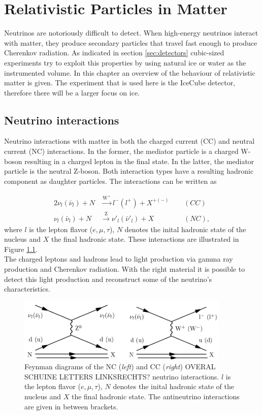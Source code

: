 \chapter{Relativistic Particles in Matter}
\label{ch:cherenkov}
Neutrinos are notoriously difficult to detect. When high-energy neutrinos interact with matter, they produce secondary particles that travel fast enough to produce Cherenkov radiation. As indicated in section \ref{sec:detectors} cubic-sized experiments try to exploit this properties by using natural ice or water as the instrumented volume. In this chapter an overview of the behaviour of relativistic matter is given. The experiment that is used here is the IceCube detector, therefore there will be a larger focus on ice.

\section{Neutrino interactions}
\label{sec:neutrinointeractions}
Neutrino interactions with matter in both the charged current (CC) and neutral current (NC) interactions. In the former, the mediator particle is a charged W-boson resulting in a charged lepton in the final state. In the latter, the mediator particle is the neutral Z-boson. Both interaction types have a resulting hadronic component as daughter particles. The interactions can be written as

\begin{alignat}{2}
\nu_l \left(\bar{\nu}_l\right) + N &\xrightarrow{\text{W}^+} l^- \left(l^+\right) + X^{+\left(-\right)} \ \ && \left(CC\right)\\
\nu_l \left(\bar{\nu}_l\right) + N &\xrightarrow{\text{Z}} \nu'_l \left(\bar{\nu}'_l\right) + X && \left(NC\right),
\end{alignat}
where $l$ is the lepton flavor ($e,\mu,\tau$), $N$ denotes the inital hadronic state of the nucleus and $X$ the final hadronic state. These interactions are illustrated in Figure \ref{fig:feynmanneutrino}.\\
\newline
The charged leptons and hadrons lead to light production via gamma ray production and Cherenkov radiation. With the right material it is possible to detect this light production and reconstruct some of the neutrino's characteristics.

\begin{figure}[t]
\centering
\includegraphics[width = 0.9\textwidth]{chapter4/img/feynmanneutrino.png}
\caption{Feynman diagrams of the NC (\textit{left}) and CC (\textit{right}) OVERAL SCHUINE LETTERS LINKSRECHTS? neutrino interactions. $l$ is the lepton flavor ($e,\mu,\tau$), $N$ denotes the inital hadronic state of the nucleus and $X$ the final hadronic state. The antineutrino interactions are given in between brackets.}
\label{fig:feynmanneutrino}
\end{figure}

